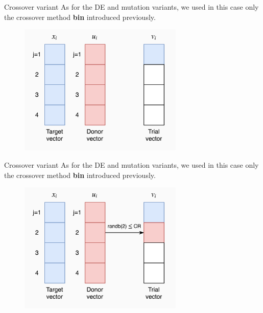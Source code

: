 \documentclass[xcolor={usenames}]{beamer}
\begin{document}
  \begin{frame}{Crossover variant}
	As for the DE and mutation variants, we used in this case only the crossover method \textbf{bin} introduced previously.
	\begin{figure}
		\centering
		\includegraphics[width=0.7\textwidth]{../figures/bin-1.png}
	\end{figure}
  \end{frame}
  
  \begin{frame}{Crossover variant}
	As for the DE and mutation variants, we used in this case only the crossover method \textbf{bin} introduced previously.
	\begin{figure}
		\centering
		\includegraphics[width=0.7\textwidth]{../figures/bin-2.png}
	\end{figure}
  \end{frame}
  
\end{document}
